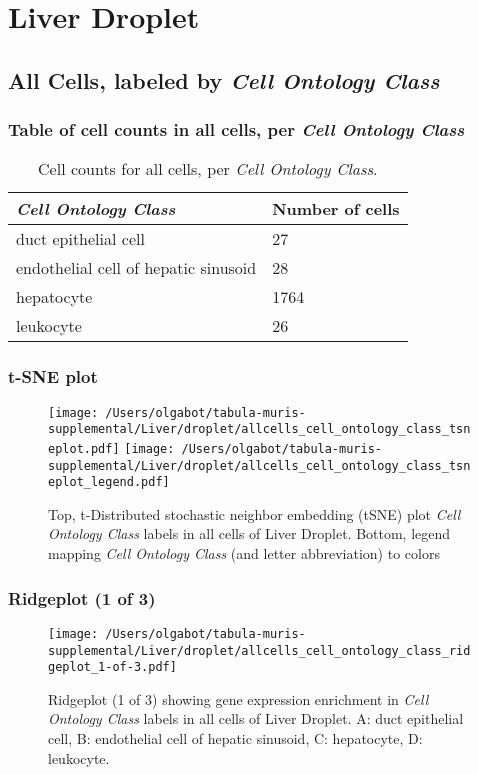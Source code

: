 \clearpage
\section{Liver Droplet}

\subsection{All Cells, labeled by \emph{Cell Ontology Class}}
\subsubsection{Table of cell counts in all cells, per \emph{Cell Ontology Class}}\begin{table}[h]
\centering
\label{my-label}
\begin{tabular}{@{}ll@{}}
\toprule

\emph{Cell Ontology Class}& Number of cells \\ \midrule
duct epithelial cell & 27 \\

endothelial cell of hepatic sinusoid & 28 \\

hepatocyte & 1764 \\

leukocyte & 26 \\
\bottomrule
\end{tabular}
\caption{Cell counts for all cells, per \emph{Cell Ontology Class}.}
\end{table}

\clearpage
\subsubsection{t-SNE plot}
\begin{figure}[h]
\centering
\texttt{[image: /Users/olgabot/tabula-muris-supplemental/Liver/droplet/allcells\_cell\_ontology\_class\_tsneplot.pdf]}
\texttt{[image: /Users/olgabot/tabula-muris-supplemental/Liver/droplet/allcells\_cell\_ontology\_class\_tsneplot\_legend.pdf]}
\caption{Top, t-Distributed stochastic neighbor embedding (tSNE) plot  \emph{Cell Ontology Class} labels in all cells of Liver Droplet. Bottom, legend mapping \emph{Cell Ontology Class} (and letter abbreviation) to colors}
\end{figure}


\clearpage

\subsubsection{Ridgeplot (1 of 3)}
\begin{figure}[h]
\centering
\texttt{[image: /Users/olgabot/tabula-muris-supplemental/Liver/droplet/allcells\_cell\_ontology\_class\_ridgeplot\_1-of-3.pdf]}

\caption{ Ridgeplot (1 of 3)  showing gene expression enrichment in \emph{Cell Ontology Class} labels in all cells of Liver Droplet. A: duct epithelial cell, B: endothelial cell of hepatic sinusoid, C: hepatocyte, D: leukocyte.}
\end{figure}


